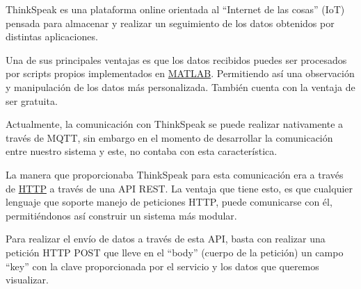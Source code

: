 ThinkSpeak es una plataforma online orientada al ``Internet de las cosas'' (IoT) pensada para almacenar y realizar un seguimiento de los datos obtenidos por distintas aplicaciones.

Una de sus principales ventajas es que los datos recibidos puedes ser procesados por scripts propios implementados en \href{https://es.mathworks.com/products/matlab.html}{MATLAB}. Permitiendo así una observación y manipulación de los datos más personalizada. También cuenta con la ventaja de ser gratuita.

Actualmente, la comunicación con ThinkSpeak se puede realizar nativamente a través de MQTT, sin embargo en el momento de desarrollar la comunicación entre nuestro sistema y este, no contaba con esta característica.

La manera que proporcionaba ThinkSpeak para esta comunicación era a través de \href{https://es.wikipedia.org/wiki/Hypertext_Transfer_Protocol}{HTTP} a través de una API REST. La ventaja que tiene esto, es que cualquier lenguaje que soporte manejo de peticiones HTTP, puede comunicarse con él, permitiéndonos así construir un sistema más modular.

Para realizar el envío de datos a través de esta API, basta con realizar una petición HTTP POST que lleve en el ``body'' (cuerpo de la petición) un campo ``key'' con la clave proporcionada por el servicio y los datos que queremos visualizar.
